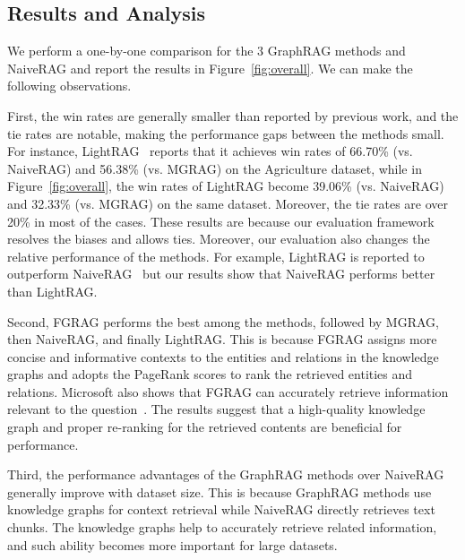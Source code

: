 \subsection{Results and Analysis}

We perform a one-by-one comparison for the 3 GraphRAG methods and NaiveRAG and report the results in Figure~\ref{fig:overall}. We can make the following observations.

First, the win rates are generally smaller than reported by previous work, and the tie rates are notable, making the performance gaps between the methods small. For instance, LightRAG~\cite{guo2024lightrag} reports that it achieves win rates of 66.70\% (vs. NaiveRAG) and 56.38\% (vs. MGRAG) on the Agriculture dataset, while in Figure~\ref{fig:overall}, the win rates of LightRAG become 39.06\% (vs. NaiveRAG) and 32.33\% (vs. MGRAG) on the same dataset. Moreover, the tie rates are over 20\% in most of the cases. These results are because our evaluation framework resolves the biases and allows ties. Moreover, our evaluation also changes the relative performance of the methods. For example, LightRAG is reported to outperform NaiveRAG~\cite{guo2024lightrag} but our results show that NaiveRAG performs better than LightRAG.   


Second, FGRAG performs the best among the methods, followed by MGRAG, then NaiveRAG, and finally LightRAG. This is because FGRAG assigns more concise and informative contexts to the entities and relations in the knowledge graphs and adopts the PageRank scores to rank the retrieved entities and relations. Microsoft also shows that FGRAG can accurately retrieve information relevant to the question~\cite{fastgraphrag2024}. The results suggest that a high-quality knowledge graph and proper re-ranking for the retrieved contents are beneficial for performance.

Third, the performance advantages of the GraphRAG methods over NaiveRAG generally improve with dataset size. This is because GraphRAG methods use knowledge graphs for context retrieval while NaiveRAG directly retrieves text chunks. The knowledge graphs help to accurately retrieve related information, and such ability becomes more important for large datasets. 


